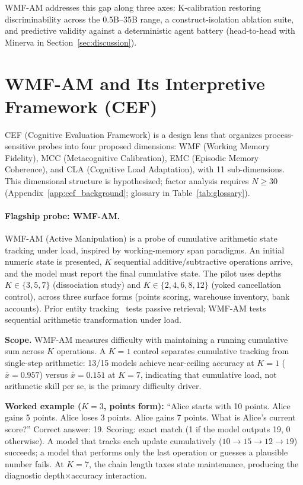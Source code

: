 \documentclass{article}
\begin{document}
WMF-AM addresses this gap along three axes:
K-calibration restoring discriminability across the 0.5B--35B range,
a construct-isolation ablation suite, and predictive validity against a
deterministic agent battery (head-to-head with Minerva in
Section~\ref{sec:discussion}).

\section{WMF-AM and Its Interpretive Framework (CEF)}
\label{sec:cef}

CEF (Cognitive Evaluation Framework) is a design lens that organizes
process-sensitive probes into four proposed dimensions: WMF
(Working Memory Fidelity), MCC (Metacognitive Calibration),
EMC (Episodic Memory Coherence), and CLA (Cognitive Load Adaptation),
with 11 sub-dimensions.
This dimensional structure is hypothesized; factor analysis requires
$N{\geq}30$ (Appendix~\ref{app:cef_background};
glossary in Table~\ref{tab:glossary}).

\paragraph{Flagship probe: WMF-AM.}
\label{sec:wmfam_probe}
WMF-AM (Active Manipulation) is a probe of cumulative arithmetic
state tracking under load, inspired by working-memory span paradigms.
An initial numeric state is presented, $K$ sequential additive/subtractive
operations arrive, and the model must report the final cumulative state.
The pilot uses depths $K \in \{3,5,7\}$ (dissociation study) and $K
\in \{2,4,6,8,12\}$ (yoked cancellation control), across three surface
forms (points scoring, warehouse inventory, bank accounts). Prior entity
tracking~\citep{entitytracking2023} tests passive retrieval; WMF-AM
tests sequential arithmetic transformation under load.

\textbf{Scope.} WMF-AM measures difficulty with maintaining a running
cumulative sum across $K$ operations.
A $K{=}1$ control separates cumulative tracking from single-step arithmetic:
13/15 models achieve near-ceiling accuracy at $K{=}1$
($\bar{x}{=}0.957$) versus $\bar{x}{=}0.151$ at $K{=}7$,
indicating that cumulative load, not arithmetic skill per se,
is the primary difficulty driver.

\textbf{Worked example ($K{=}3$, points form):} ``Alice starts
with 10 points. Alice gains 5 points. Alice loses 3 points. Alice gains
7 points. What is Alice's current score?'' Correct answer: 19.
Scoring: exact match (1 if the model outputs 19, 0 otherwise).
A model that tracks each update cumulatively
($10 \to 15 \to 12 \to 19$) succeeds; a model that performs only the
last operation or guesses a plausible number fails. At $K{=}7$, the
chain length taxes state maintenance, producing the diagnostic
depth$\times$accuracy interaction.
\end{document}

